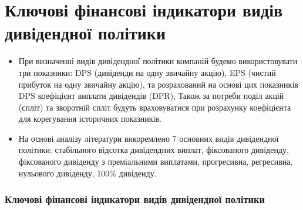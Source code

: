 \documentclass[aspectratio=169]{beamer}
\begin{document}
\section{Ключові фінансові індикатори видів дивідендної політики}
\begin{frame}
\begin{itemize}
\item При визначенні видів дивідендної політики компаній будемо використовувати три показники: \alert {DPS} (дивіденди на одну звичайну акцію), \alert {EPS} (чистий прибуток на одну звичайну акцію), та розрахований на основі цих показників \alert {DPS} коефіцієнт виплати дивідендів (DPR), Також за потреби поділ акцій (спліт) та зворотній спліт будуть враховуватися при розрахунку \alert {коефіцієнта для корегування історичних показників}.
\bigskip
\item На основі аналізу літератури викоремлено 7 основних \alert {видів
дивідендної політики}: стабільного відсотка дивідендних виплат, фіксованого дивіденду, фіксованого дивіденду з преміальними виплатами, прогресивна, регресивна, нульового дивіденду, 100\% дивіденду.
\end{itemize}
\frametitle{Ключові фінансові індикатори видів дивідендної політики}
\end{frame}
\end{document}
